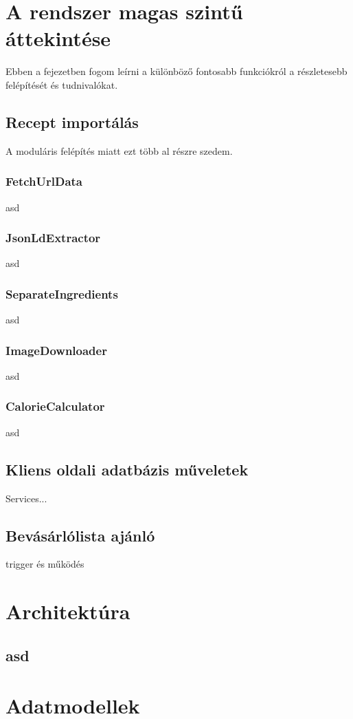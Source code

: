 \documentclass[12pt]{report}
\theoremstyle{definition}
\begin{document}
\chapter{A rendszer magas szintű áttekintése}
Ebben a fejezetben fogom leírni a különböző fontosabb funkciókról a részletesebb felépítését és tudnivalókat.

\section{Recept importálás}
A moduláris felépítés miatt ezt több al részre szedem.

\subsection{FetchUrlData}
asd
\subsection{JsonLdExtractor}
asd
\subsection{SeparateIngredients}
asd
\subsection{ImageDownloader} 
asd
\subsection{CalorieCalculator}
asd
\section{Kliens oldali adatbázis műveletek}
Services...

\section{Bevásárlólista ajánló}
trigger és működés


\chapter{Architektúra}
\section{asd}


\chapter{Adatmodellek}
\end{document}
